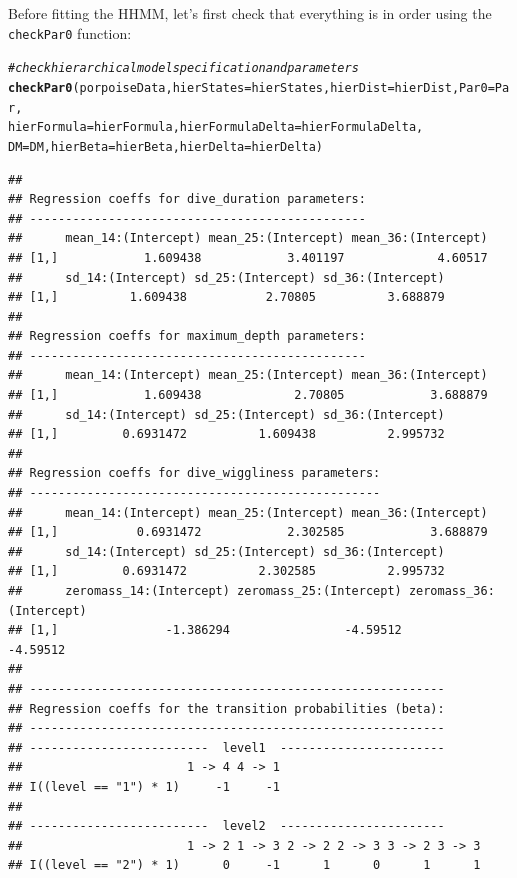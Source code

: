 \documentclass[12pt]{article}\usepackage[]{graphicx}\usepackage[]{xcolor}
\makeatletter
\newcommand{\hlcom}[1]{\textcolor[rgb]{0.678,0.584,0.686}{\textit{#1}}}%
\newcommand{\hldef}[1]{\textcolor[rgb]{0.345,0.345,0.345}{#1}}%
\newcommand{\hlkwc}[1]{\textcolor[rgb]{0.333,0.667,0.333}{#1}}%
\newcommand{\hlkwd}[1]{\textcolor[rgb]{0.737,0.353,0.396}{\textbf{#1}}}%
\newenvironment{kframe}{%
 \def\at@end@of@kframe{}%
 \ifinner\ifhmode%
  \def\at@end@of@kframe{\end{minipage}}%
  \begin{minipage}{\columnwidth}%
 \fi\fi%
 \def\FrameCommand##1{\hskip\@totalleftmargin \hskip-\fboxsep
 \colorbox{shadecolor}{##1}\hskip-\fboxsep
     \hskip-\linewidth \hskip-\@totalleftmargin \hskip\columnwidth}%
 \MakeFramed {\advance\hsize-\width
   \@totalleftmargin\z@ \linewidth\hsize
   \@setminipage}}%
 {\par\unskip\endMakeFramed%
 \at@end@of@kframe}
\newenvironment{knitrout}{}{} %
\makeatother
\begin{document}
Before fitting the HHMM, let's first check that everything is in order using the \verb|checkPar0| function:
\begin{knitrout}
\color{fgcolor}\begin{kframe}
\begin{alltt}
\hlcom{# check hierarchical model specification and parameters}
\hlkwd{checkPar0}\hldef{(porpoiseData,}\hlkwc{hierStates}\hldef{=hierStates,}\hlkwc{hierDist}\hldef{=hierDist,}\hlkwc{Par0}\hldef{=Par,}
          \hlkwc{hierFormula}\hldef{=hierFormula,}\hlkwc{hierFormulaDelta}\hldef{=hierFormulaDelta,}
          \hlkwc{DM}\hldef{=DM,}\hlkwc{hierBeta}\hldef{=hierBeta,}\hlkwc{hierDelta}\hldef{=hierDelta)}
\end{alltt}
\begin{verbatim}
## 
## Regression coeffs for dive_duration parameters:
## -----------------------------------------------
##      mean_14:(Intercept) mean_25:(Intercept) mean_36:(Intercept)
## [1,]            1.609438            3.401197             4.60517
##      sd_14:(Intercept) sd_25:(Intercept) sd_36:(Intercept)
## [1,]          1.609438           2.70805          3.688879
## 
## Regression coeffs for maximum_depth parameters:
## -----------------------------------------------
##      mean_14:(Intercept) mean_25:(Intercept) mean_36:(Intercept)
## [1,]            1.609438             2.70805            3.688879
##      sd_14:(Intercept) sd_25:(Intercept) sd_36:(Intercept)
## [1,]         0.6931472          1.609438          2.995732
## 
## Regression coeffs for dive_wiggliness parameters:
## -------------------------------------------------
##      mean_14:(Intercept) mean_25:(Intercept) mean_36:(Intercept)
## [1,]           0.6931472            2.302585            3.688879
##      sd_14:(Intercept) sd_25:(Intercept) sd_36:(Intercept)
## [1,]         0.6931472          2.302585          2.995732
##      zeromass_14:(Intercept) zeromass_25:(Intercept) zeromass_36:(Intercept)
## [1,]               -1.386294                -4.59512                -4.59512
## 
## ----------------------------------------------------------
## Regression coeffs for the transition probabilities (beta):
## ----------------------------------------------------------
## -------------------------  level1  -----------------------
##                       1 -> 4 4 -> 1
## I((level == "1") * 1)     -1     -1
## 
## -------------------------  level2  -----------------------
##                       1 -> 2 1 -> 3 2 -> 2 2 -> 3 3 -> 2 3 -> 3
## I((level == "2") * 1)      0     -1      1      0      1      1

\end{verbatim}
\end{kframe}
\end{knitrout}
\end{document}
